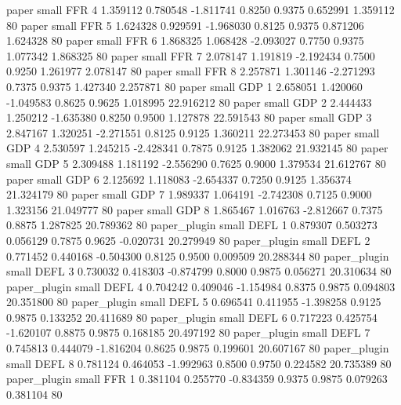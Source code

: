          paper      small      FFR                 4 1.359112 0.780548 -1.811741 0.8250 0.9375  0.652991    1.359112 80
         paper      small      FFR                 5 1.624328 0.929591 -1.968030 0.8125 0.9375  0.871206    1.624328 80
         paper      small      FFR                 6 1.868325 1.068428 -2.093027 0.7750 0.9375  1.077342    1.868325 80
         paper      small      FFR                 7 2.078147 1.191819 -2.192434 0.7500 0.9250  1.261977    2.078147 80
         paper      small      FFR                 8 2.257871 1.301146 -2.271293 0.7375 0.9375  1.427340    2.257871 80
         paper      small      GDP                 1 2.658051 1.420060 -1.049583 0.8625 0.9625  1.018995   22.916212 80
         paper      small      GDP                 2 2.444433 1.250212 -1.635380 0.8250 0.9500  1.127878   22.591543 80
         paper      small      GDP                 3 2.847167 1.320251 -2.271551 0.8125 0.9125  1.360211   22.273453 80
         paper      small      GDP                 4 2.530597 1.245215 -2.428341 0.7875 0.9125  1.382062   21.932145 80
         paper      small      GDP                 5 2.309488 1.181192 -2.556290 0.7625 0.9000  1.379534   21.612767 80
         paper      small      GDP                 6 2.125692 1.118083 -2.654337 0.7250 0.9125  1.356374   21.324179 80
         paper      small      GDP                 7 1.989337 1.064191 -2.742308 0.7125 0.9000  1.323156   21.049777 80
         paper      small      GDP                 8 1.865467 1.016763 -2.812667 0.7375 0.8875  1.287825   20.789362 80
  paper_plugin      small     DEFL                 1 0.879307 0.503273  0.056129 0.7875 0.9625 -0.020731   20.279949 80
  paper_plugin      small     DEFL                 2 0.771452 0.440168 -0.504300 0.8125 0.9500  0.009509   20.288344 80
  paper_plugin      small     DEFL                 3 0.730032 0.418303 -0.874799 0.8000 0.9875  0.056271   20.310634 80
  paper_plugin      small     DEFL                 4 0.704242 0.409046 -1.154984 0.8375 0.9875  0.094803   20.351800 80
  paper_plugin      small     DEFL                 5 0.696541 0.411955 -1.398258 0.9125 0.9875  0.133252   20.411689 80
  paper_plugin      small     DEFL                 6 0.717223 0.425754 -1.620107 0.8875 0.9875  0.168185   20.497192 80
  paper_plugin      small     DEFL                 7 0.745813 0.444079 -1.816204 0.8625 0.9875  0.199601   20.607167 80
  paper_plugin      small     DEFL                 8 0.781124 0.464053 -1.992963 0.8500 0.9750  0.224582   20.735389 80
  paper_plugin      small      FFR                 1 0.381104 0.255770 -0.834359 0.9375 0.9875  0.079263    0.381104 80
